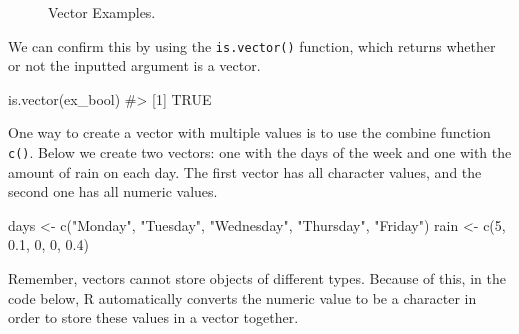 \documentclass[
  letterpaper,
]{krantz}
\makeatletter
\newenvironment{Shaded}{\begin{snugshade}}{\end{snugshade}}
\newcommand{\CommentTok}[1]{\textcolor[rgb]{0.37,0.37,0.37}{#1}}
\newcommand{\DecValTok}[1]{\textcolor[rgb]{0.68,0.00,0.00}{#1}}
\newcommand{\FloatTok}[1]{\textcolor[rgb]{0.68,0.00,0.00}{#1}}
\newcommand{\FunctionTok}[1]{\textcolor[rgb]{0.28,0.35,0.67}{#1}}
\newcommand{\NormalTok}[1]{\textcolor[rgb]{0.00,0.23,0.31}{#1}}
\newcommand{\OtherTok}[1]{\textcolor[rgb]{0.00,0.23,0.31}{#1}}
\newcommand{\StringTok}[1]{\textcolor[rgb]{0.13,0.47,0.30}{#1}}
\newenvironment{kframe}{%
\medskip{}
\setlength{\fboxsep}{.8em}
 \def\at@end@of@kframe{}%
 \ifinner\ifhmode%
  \def\at@end@of@kframe{\end{minipage}}%
  \begin{minipage}{\columnwidth}%
 \fi\fi%
 \def\FrameCommand##1{\hskip\@totalleftmargin \hskip-\fboxsep
 \colorbox{shadecolor}{##1}\hskip-\fboxsep
     \hskip-\linewidth \hskip-\@totalleftmargin \hskip\columnwidth}%
 \MakeFramed {\advance\hsize-\width
   \@totalleftmargin\z@ \linewidth\hsize
   \@setminipage}}%
 {\par\unskip\endMakeFramed%
 \at@end@of@kframe}
\renewenvironment{Shaded}{\begin{kframe}}{\end{kframe}}
\makeatother
\begin{document}
\begin{figure}


\caption{\label{fig-vectors}Vector Examples.}

\end{figure}%

We can confirm this by using the \texttt{is.vector()} function, which
returns whether or not the inputted argument is a vector.

\begin{Shaded}
\begin{Highlighting}[]
\FunctionTok{is.vector}\NormalTok{(ex\_bool)}
\CommentTok{\#\textgreater{} [1] TRUE}
\end{Highlighting}
\end{Shaded}

One way to create a vector with multiple values is to use the combine
function \texttt{c()}. Below we create two vectors: one with the days of
the week and one with the amount of rain on each day. The first vector
has all character values, and the second one has all numeric values.

\begin{Shaded}
\begin{Highlighting}[]
\NormalTok{days }\OtherTok{\textless{}{-}} \FunctionTok{c}\NormalTok{(}\StringTok{"Monday"}\NormalTok{, }\StringTok{"Tuesday"}\NormalTok{, }\StringTok{"Wednesday"}\NormalTok{, }\StringTok{"Thursday"}\NormalTok{, }\StringTok{"Friday"}\NormalTok{)}
\NormalTok{rain }\OtherTok{\textless{}{-}} \FunctionTok{c}\NormalTok{(}\DecValTok{5}\NormalTok{, }\FloatTok{0.1}\NormalTok{, }\DecValTok{0}\NormalTok{, }\DecValTok{0}\NormalTok{, }\FloatTok{0.4}\NormalTok{)}
\end{Highlighting}
\end{Shaded}

Remember, vectors cannot store objects of different types. Because of
this, in the code below, R automatically converts the numeric value to
be a character in order to store these values in a vector together.
\end{document}
